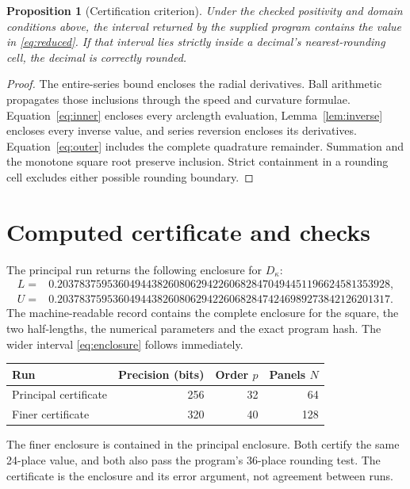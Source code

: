 \documentclass[10pt,a4paper]{article}
\newtheorem{proposition}{Proposition}
\begin{document}
\begin{proposition}[Certification criterion]
Under the checked positivity and domain conditions above, the interval returned
by the supplied program contains the value in \eqref{eq:reduced}.
If that interval lies strictly inside a decimal's nearest-rounding cell, the
decimal is correctly rounded.
\end{proposition}
\begin{proof}
The entire-series bound encloses the radial derivatives.
Ball arithmetic propagates those inclusions through the speed and curvature
formulae. Equation~\eqref{eq:inner} encloses every arclength evaluation,
Lemma~\ref{lem:inverse} encloses every inverse value, and series reversion
encloses its derivatives. Equation~\eqref{eq:outer} includes the complete
quadrature remainder. Summation and the monotone square root preserve inclusion.
Strict containment in a rounding cell excludes either possible rounding boundary.
\end{proof}

\section{Computed certificate and checks}
The principal run returns the following enclosure for \(D_\kappa\):
\begin{align*}
L={}&0.203783759536049443826080629422606828470494451196624581353928,\\
U={}&0.203783759536049443826080629422606828474246989273842126201317.
\end{align*}
The machine-readable record contains the complete enclosure for the square,
the two half-lengths, the numerical parameters and the exact program hash.
The wider interval \eqref{eq:enclosure} follows immediately.

\begin{center}
\begin{tabular}{lrrr}
\toprule
Run & Precision (bits) & Order \(p\) & Panels \(N\)\\
\midrule
Principal certificate & 256 & 32 & 64\\
Finer certificate & 320 & 40 & 128\\
\bottomrule
\end{tabular}
\end{center}
The finer enclosure is contained in the principal enclosure. Both certify the
same 24-place value, and both also pass the program's 36-place rounding test.
The certificate is the enclosure and its error argument, not agreement between runs.
\end{document}
